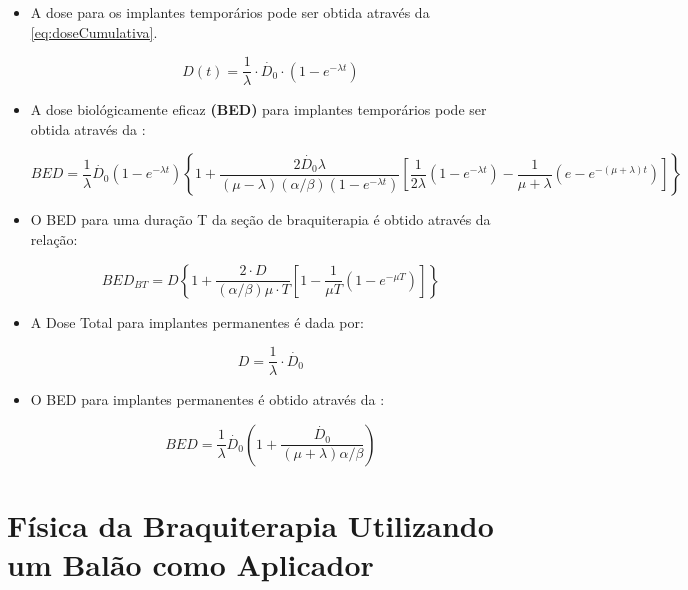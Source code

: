 \documentclass[11pt,a4paper]{article}
\begin{document}
			\begin{itemize}
		
			
				\item A dose para os implantes temporários pode ser obtida através da   \ref{eq:doseCumulativa}. 

					$$D(t) = \frac{1}{\lambda} \cdot \dot{D_0} \cdot \left(1 - e^{-\lambda t}\right)$$

				\item A dose biológicamente eficaz \textbf{\textcolor{CarnationPink}{(BED)}} para implantes temporários pode ser obtida através da  :

					\begin{equation}
						BED = \frac{1}{\lambda} \dot{D_0}\left(1 - e^{-\lambda t}\right)
						\left\{ 1 + \frac{2 \dot{D_0}\lambda}{(\mu - \lambda)(\alpha / \beta) (1 - e^{-\lambda t})}
						\left[\frac{1}{2\lambda}(1 - e^{-\lambda t }) - \frac{1}{\mu + \lambda} (e - e^{-(\mu + \lambda) t})\right]\right\} 
					\end{equation}

				\item O BED para uma duração T da seção de braquiterapia é obtido através da relação:

					\begin{equation}
						BED_{BT} = D \left\{ 1 + \frac{2 \cdot D}{(\alpha / \beta)\mu \cdot T}
						\left[1 - \frac{1}{\mu T} (1 - e^{-\mu T})\right]\right\}
					\end{equation}
				
				\item A Dose Total para implantes permanentes é dada por:
					
					\begin{equation}
						D = \frac{1}{\lambda} \cdot \dot{D_0}
					\end{equation}
				
				\item O BED para implantes permanentes é obtido através da  :
					
					\begin{equation}
						BED = \frac{1}{\lambda} \dot{D_0} \left(1 + \frac{\dot{D_0}}{(\mu + \lambda) \alpha / \beta}\right)
					\end{equation}
			
			\end{itemize}


	\section{Física da Braquiterapia Utilizando um Balão como Aplicador}
\end{document}
